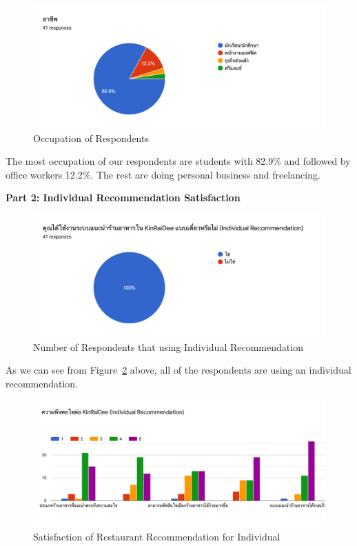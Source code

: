 \documentclass[12pt,oneside,openright,a4paper]{cpe-english-project}
\begin{document}
\begin{figure}[H]\centering
\includegraphics[width=350pt]{./images/A2OccupationofRespondents.png}
\caption{Occupation of Respondents}\label{fig:A2OccupationofRespondents}
\end{figure}\vspace{-24pt}

The most occupation of our respondents are students with 82.9\% and followed by office workers 12.2\%. The rest are doing personal business and freelancing.

\newpage
\textbf{Part 2: Individual Recommendation Satisfaction}

\begin{figure}[H]\centering
\includegraphics[width=350pt]{./images/A2NumberofRespondentsthatusingIndividualRecommendation.png}
\caption{Number of Respondents that using Individual Recommendation}\label{fig:A2NumberofRespondentsthatusingIndividualRecommendation}
\end{figure}\vspace{-24pt}

As we can see from Figure~\ref{fig:A2NumberofRespondentsthatusingIndividualRecommendation} above, all of the respondents are using an individual recommendation.

\begin{figure}[H]\centering
\includegraphics[width=350pt]{./images/A2SatisfactionofRestaurantRecommendationforIndividual.png}
\caption{Satisfaction of Restaurant Recommendation for Individual}\label{fig:A2SatisfactionofRestaurantRecommendationforIndividual}
\end{figure}\vspace{-24pt}
\end{document}
